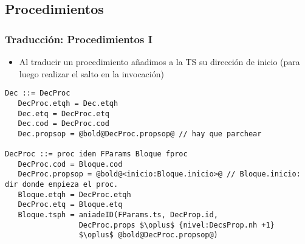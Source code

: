 \documentclass[hyperref={pdfpagelabels=false},tree-dvips,compress]{beamer}
\begin{document}
\subsection{Procedimientos}
\begin{frame}[fragile]
\frametitle{Traducción: Procedimientos I}

\begin{itemize}
	\item Al traducir un procedimiento añadimos a la TS su dirección de inicio (para luego realizar el salto en la invocación)
\end{itemize}

\begin{lstlisting}[style=gramaticas,basicstyle=\scriptsize\ttfamily,mathescape]
Dec ::= DecProc
   DecProc.etqh = Dec.etqh
   Dec.etq = DecProc.etq
   Dec.cod = DecProc.cod
   Dec.propsop = @bold@DecProc.propsop@ // hay que parchear

DecProc ::= proc iden FParams Bloque fproc
   DecProc.cod = Bloque.cod
   DecProc.propsop = @bold@<inicio:Bloque.inicio>@ // Bloque.inicio: dir donde empieza el proc.
   Bloque.etqh = DecProc.etqh
   DecProc.etq = Bloque.etq
   Bloque.tsph = aniadeID(FParams.ts, DecProp.id,
   	             DecProc.props $\oplus$ {nivel:DecsProp.nh +1}
                 $\oplus$ @bold@DecProc.propsop@)
\end{lstlisting}

\end{frame}
\end{document}
